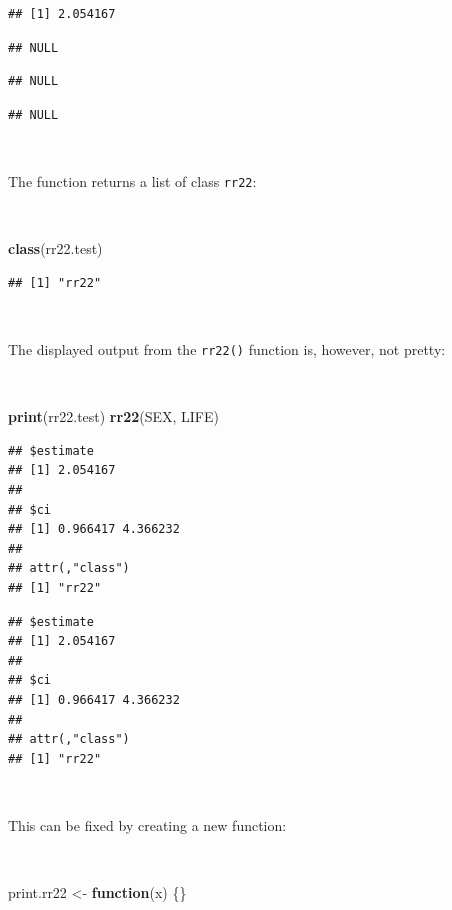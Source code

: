 \documentclass[12pt,a4paper]{book}
\newenvironment{Shaded}{\begin{snugshade}}{\end{snugshade}}
\newcommand{\ControlFlowTok}[1]{\textcolor[rgb]{0.13,0.29,0.53}{\textbf{#1}}}
\newcommand{\KeywordTok}[1]{\textcolor[rgb]{0.13,0.29,0.53}{\textbf{#1}}}
\newcommand{\NormalTok}[1]{#1}
\newcommand{\StringTok}[1]{\textcolor[rgb]{0.31,0.60,0.02}{#1}}
\theoremstyle{definition}
\theoremstyle{definition}
\theoremstyle{definition}
\theoremstyle{remark}
\begin{document}
\begin{verbatim}
## [1] 2.054167
\end{verbatim}

\begin{verbatim}
## NULL
\end{verbatim}

\begin{verbatim}
## NULL
\end{verbatim}

\begin{verbatim}
## NULL
\end{verbatim}

~

The function returns a list of class \texttt{rr22}:

~

\begin{Shaded}
\begin{Highlighting}[]
\KeywordTok{class}\NormalTok{(rr22.test)}
\end{Highlighting}
\end{Shaded}

\begin{verbatim}
## [1] "rr22"
\end{verbatim}

~

The displayed output from the \texttt{rr22()} function is, however, not
pretty:

~

\begin{Shaded}
\begin{Highlighting}[]
\KeywordTok{print}\NormalTok{(rr22.test)}
\KeywordTok{rr22}\NormalTok{(SEX, LIFE)}
\end{Highlighting}
\end{Shaded}

\begin{verbatim}
## $estimate
## [1] 2.054167
## 
## $ci
## [1] 0.966417 4.366232
## 
## attr(,"class")
## [1] "rr22"
\end{verbatim}

\begin{verbatim}
## $estimate
## [1] 2.054167
## 
## $ci
## [1] 0.966417 4.366232
## 
## attr(,"class")
## [1] "rr22"
\end{verbatim}

~

This can be fixed by creating a new function:

~

\begin{Shaded}
\begin{Highlighting}[]
\NormalTok{print.rr22 <-}\StringTok{ }\ControlFlowTok{function}\NormalTok{(x) \{\}}
\end{Highlighting}
\end{Shaded}
\end{document}
